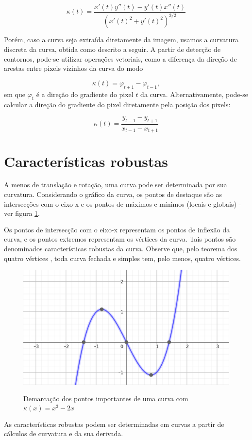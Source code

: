 \documentclass[
	12pt,				%
	oneside,			%
	a4paper,			%
	sumario=tradicional,
	english,			%
	french,				%
	spanish,			%
	brazil,				%
]{abntex2}
\begin{document}
$$\kappa (t) = \frac{x'(t) y''(t) - y'(t) x''(t)}{(x'(t)^2 + y'(t)^2)^{3/2}}$$

Porém, caso a curva seja extraída diretamente da imagem, usamos a curvatura discreta da curva, obtida como descrito a seguir. A partir de detecção de contornos, pode-se utilizar operações vetoriais, como a diferença da direção de arestas entre pixels vizinhos da curva do modo

$$\kappa (t) = \varphi_{t+1} - \varphi_{t-1},$$ em que $\varphi_t$ é a direção do gradiente do pixel $t$ da curva. Alternativamente, pode-se calcular a direção do gradiente do pixel diretamente pela posição dos pixels:

$$\kappa (t) = \frac{y_{t - 1} - y_{t+1}}{x_{t - 1} - x_{t+1}}$$

\section{Características robustas}

A menos de translação e rotação, uma curva pode ser determinada por sua curvatura. Considerando o gráfico da curva, os pontos de destaque são as intersecções com o eixo-x e os pontos de máximos e mínimos (locais e globais) - ver figura \ref{fig:caractrobust}.

Os pontos de intersecção com o eixo-x representam os pontos de inflexão da curva, e os pontos extremos representam os vértices da curva. Tais pontos são denominados características robustas da curva. Observe que, pelo teorema dos quatro vértices \cite{book_manfredo}, toda curva fechada e simples tem, pelo menos, quatro vértices.

\begin{figure}[htb]
\centering
    \caption{Demarcação dos pontos importantes de uma curva com $\kappa(x) = x^3 - 2x$}
    \includegraphics[width=.5\linewidth]{./img/curva.png}
    \label{fig:caractrobust}
\end{figure}

As características robustas podem ser determinadas em curvas a partir de cálculos de curvatura e da sua derivada.
\end{document}
